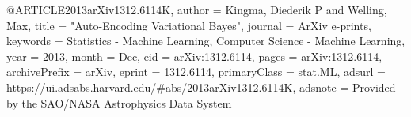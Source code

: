 @ARTICLE{2013arXiv1312.6114K,
       author = {{Kingma}, Diederik P and {Welling}, Max},
        title = "{Auto-Encoding Variational Bayes}",
      journal = {ArXiv e-prints},
     keywords = {Statistics - Machine Learning, Computer Science - Machine Learning},
         year = 2013,
        month = Dec,
          eid = {arXiv:1312.6114},
        pages = {arXiv:1312.6114},
archivePrefix = {arXiv},
       eprint = {1312.6114},
 primaryClass = {stat.ML},
       adsurl = {https://ui.adsabs.harvard.edu/#abs/2013arXiv1312.6114K},
      adsnote = {Provided by the SAO/NASA Astrophysics Data System}
}